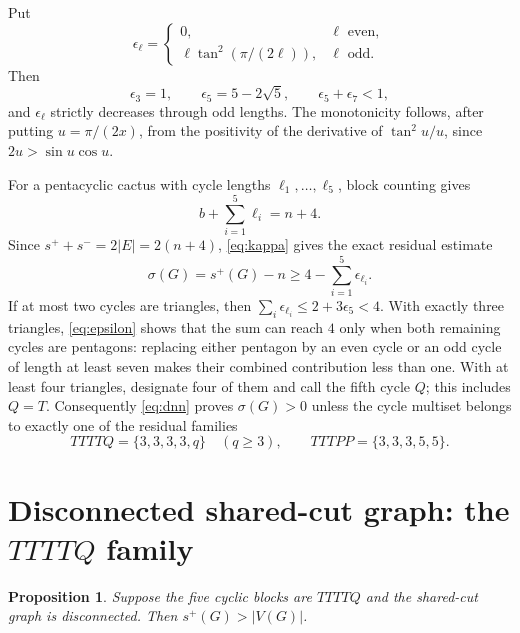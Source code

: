 \documentclass[11pt]{article}
\newtheorem{proposition}[theorem]{Proposition}
\newcommand{\spE}{s^+}
\newcommand{\smE}{s^-}
\newcommand{\sig}{\sigma}
\begin{document}
Put
\[
 \epsilon_\ell=\begin{cases}
 0,&\ell\text{ even},\\
 \ell\tan^2(\pi/(2\ell)),&\ell\text{ odd}.
 \end{cases}
\]
Then
\begin{equation}\label{eq:epsilon}
 \epsilon_3=1,
 \qquad \epsilon_5=5-2\sqrt5,
 \qquad \epsilon_5+\epsilon_7<1,
\end{equation}
and $\epsilon_\ell$ strictly decreases through odd lengths.  The monotonicity
follows, after putting $u=\pi/(2x)$, from the positivity of the derivative of
$\tan^2u/u$, since $2u>\sin u\cos u$.

For a pentacyclic cactus with cycle lengths $\ell_1,\ldots,\ell_5$, block
counting gives
\[
 b+\sum_{i=1}^5\ell_i=n+4.
\]
Since $\spE+\smE=2|E|=2(n+4)$, \eqref{eq:kappa} gives the exact residual
estimate
\begin{equation}\label{eq:dnn}
 \sig(G)=\spE(G)-n\geq4-\sum_{i=1}^5\epsilon_{\ell_i}.
\end{equation}
If at most two cycles are triangles, then
$\sum_i\epsilon_{\ell_i}\leq2+3\epsilon_5<4$.  With exactly three
triangles, \eqref{eq:epsilon} shows that the sum can reach $4$ only when both
remaining cycles are pentagons: replacing either pentagon by an even cycle or
an odd cycle of length at least seven makes their combined contribution less
than one.  With at least four triangles, designate four of them and call the
fifth cycle $Q$; this includes $Q=T$.  Consequently \eqref{eq:dnn} proves
$\sig(G)>0$ unless the cycle multiset belongs to exactly one of the residual
families
\begin{equation}\label{eq:residual}
 TTTTQ=\{3,3,3,3,q\}\quad(q\geq3),
 \qquad TTTPP=\{3,3,3,5,5\}.
\end{equation}

\section{Disconnected shared-cut graph: the $TTTTQ$ family}

\begin{proposition}\label{prop:disconnected-ttttq}
Suppose the five cyclic blocks are $TTTTQ$ and the shared-cut graph is
disconnected.  Then $\spE(G)>|V(G)|$.
\end{proposition}
\end{document}
